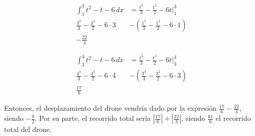 \begin{align*}
    \int_{1}^{3} t^2 - t - 6 \,dx             & = \frac{t^3}{3} - \frac{t^2}{2} - 6t \Big|_1^3             \\
    \frac{3^3}{3} - \frac{3^2}{2} - 6 \cdot 3 & - \left( \frac{1^3}{3} - \frac{1^2}{2} - 6 \cdot 1 \right) \\
    - \frac{22}{3}
\end{align*}

\begin{align*}
    \int_{3}^{4} t^2 - t - 6 \,dx             & = \frac{t^3}{3} - \frac{t^2}{2} - 6t \Big|_3^4             \\
    \frac{4^3}{3} - \frac{4^2}{2} - 6 \cdot 4 & - \left( \frac{3^3}{3} - \frac{3^2}{2} - 6 \cdot 3 \right) \\
    \frac{17}{6}
\end{align*}

Entonces, el desplazamiento del drone vendría dado por la expresión $\frac{17}{6} - \frac{22}{3}$, siendo $- \frac{9}{2}$. Por su parte, el recorrido total sería $|\frac{17}{6}| + |\frac{22}{3}|$, siendo $\frac{61}{6}$ el recorrido total del drone.